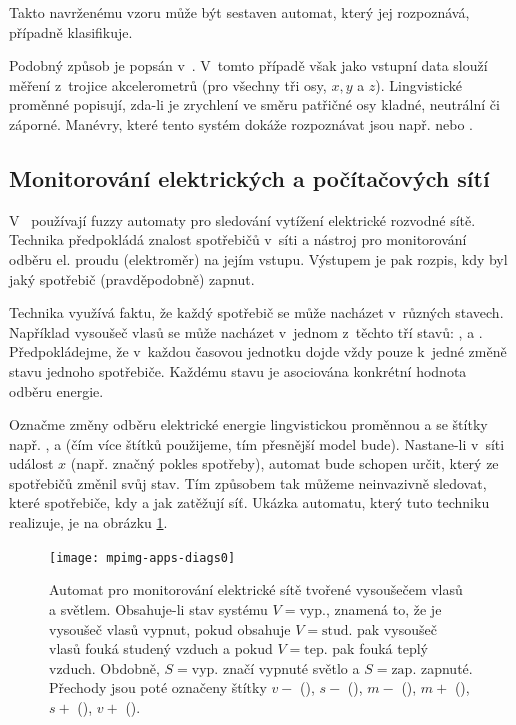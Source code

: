 Takto navrženému vzoru může být sestaven automat, který jej rozpoznává, případně klasifikuje.

Podobný způsob je popsán v~\cite{Hul+-ManRecUsProFinStaMacFuzLog}. V~tomto případě však jako vstupní data slouží měření z~trojice akcelerometrů (pro všechny tři osy, $x, y$ a $z$). Lingvistické proměnné popisují, zda-li je zrychlení ve směru patřičné osy kladné, neutrální či záporné. Manévry, které tento systém dokáže rozpoznávat jsou např.  nebo .

\subsection{Monitorování elektrických a počítačových sítí} \label{subs:MonElComNet}
V~\cite{DucMarMar-AlgBasFiStMacFuzTrNoIntrLoaDis} používají fuzzy automaty pro sledování vytížení elektrické rozvodné sítě. Technika předpokládá znalost spotřebičů v~síti a nástroj pro monitorování odběru el. proudu (elektroměr) na jejím vstupu. Výstupem je pak rozpis, kdy byl jaký spotřebič (pravděpodobně) zapnut.

Technika využívá faktu, že každý spotřebič se může nacházet v~různých stavech. Například vysoušeč vlasů se může nacházet v~jednom z~těchto tří stavů: ,  a . Předpokládejme, že v~každou časovou jednotku dojde vždy pouze k~jedné změně stavu jednoho spotřebiče. Každému stavu je asociována konkrétní hodnota odběru energie.

Označme změny odběru elektrické energie lingvistickou proměnnou  a se štítky např. ,  a  (čím více štítků použijeme, tím přesnější model bude). Nastane-li v~síti událost $x$ (např. značný pokles spotřeby), automat bude schopen určit, který ze spotřebičů změnil svůj stav. Tím způsobem tak můžeme neinvazivně sledovat, které spotřebiče, kdy a jak zatěžují síť. Ukázka automatu, který tuto techniku realizuje, je na obrázku \ref{img:PowConsAut}.

\begin{figure}
 \centering
 \texttt{[image: mpimg-apps-diags0]}
 \caption[Automat pro monitorování elektrické sítě]{Automat pro monitorování elektrické sítě tvořené vysoušečem vlasů a světlem. Obsahuje-li stav systému $V = \text{vyp.}$, znamená to, že je vysoušeč vlasů vypnut, pokud obsahuje $V = \text{stud.}$ pak vysoušeč vlasů fouká studený vzduch a pokud $V = \text{tep.}$ pak fouká teplý vzduch. Obdobně, $S = \text{vyp.}$ značí vypnuté světlo a $S = \text{zap.}$ zapnuté. Přechody jsou poté označeny štítky $v-$ (), $s-$ (), $m-$ (), $m+$ (), $s+$ (), $v+$ ().}
 \label{img:PowConsAut}
\end{figure}


